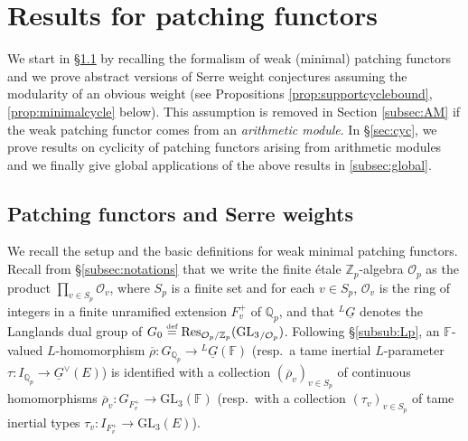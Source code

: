 \documentclass[oneside,a4paper,english, 11pt]{amsart}
\theoremstyle{plain}
\theoremstyle{plain}
\theoremstyle{plain}
\theoremstyle{plain}
\theoremstyle{plain}
\theoremstyle{plain}
\theoremstyle{definition}
\theoremstyle{definition}
\theoremstyle{definition}
\theoremstyle{remark}
\numberwithin{equation}{section}
\newcommand{\Z}{\mathbb{Z}}
\newcommand{\Q}{\mathbb{Q}}
\newcommand{\F}{\mathbb{F}}
\newcommand{\cO}{\mathcal{O}}
\newcommand{\Res}{\mathrm{Res}}
\newcommand{\GL}{\mathrm{GL}}
\newcommand{\un}[1]{\underline{#1}}
\newcommand{\rhobar}{\overline{\rho}}
\newcommand{\defeq}{\stackrel{\textrm{\tiny{def}}}{=}}
\newcommand{\ra}{\rightarrow}
\begin{document}
%
%
%
\section{Results for patching functors}
\label{sec:PF:global_applications}

We start in \S \ref{subsec:WMPF} by recalling the formalism of weak (minimal) patching functors and we prove abstract versions of Serre weight conjectures assuming the modularity of an obvious weight (see Propositions \ref{prop:supportcyclebound}, \ref{prop:minimalcycle} below).
This assumption is removed in Section \ref{subsec:AM} if the weak patching functor comes from an \emph{arithmetic module}. %
In \S \ref{sec:cyc}, we prove results on cyclicity of patching functors arising from arithmetic modules and we finally give global applications of the above results in \ref{subsec:global}.

\subsection{Patching functors and Serre weights}
\label{subsec:WMPF}
We recall the setup and the basic definitions for weak minimal patching functors.
%
%
Recall from \S \ref{subsec:notations} that we write the finite \'etale $\Z_p$-algebra $\cO_p$ as the product $\prod\limits_{v\in S_p} \cO_v$, where $S_p$ is a finite set and for each $v\in S_p$, $\cO_v$ is the ring of integers in a finite unramified extension $F^+_v$ of $\Q_p$, and that  $^L \un{G}$ denotes the Langlands dual group of $G_0\defeq \Res_{\cO_p/\Z_p} ({\GL_3}_{/\cO_p})$.
Following \S \ref{subsub:Lp}, an $\F$-valued $L$-homomorphism $\rhobar: G_{\Q_p} \ra{}^L \un{G}(\F)$ (resp.~a tame inertial $L$-parameter $\tau: I_{\Q_p} \ra\un{G}^\vee(E)$) is identified with a collection $(\rhobar_v)_{v\in S_p}$ of continuous homomorphisms $\rhobar_v:G_{F^+_v}\ra\GL_3(\F)$ (resp.~with a collection $(\tau_v)_{v\in S_p}$ of tame inertial types $\tau_v:I_{F^+_v}\ra\GL_3(E)$).

%
%
%
%
%
%
%
%
%
%
\end{document}
